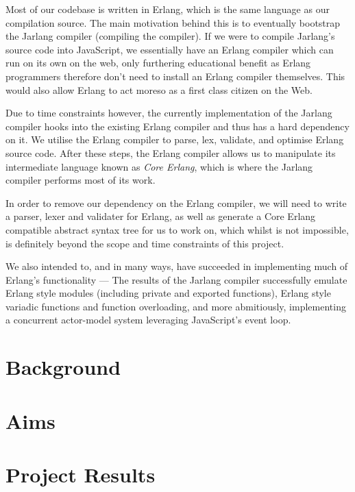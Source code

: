 \documentclass[twoside,12pt,titlepage,a4paper]{article}
\begin{document}
	Most of our codebase is written in Erlang, which is the same language as our compilation source. The main motivation behind this is to eventually bootstrap the Jarlang compiler (compiling the compiler). If we were to compile Jarlang's source code into JavaScript, we essentially have an Erlang compiler which can run on its own on the web, only furthering educational benefit as Erlang programmers therefore don't need to install an Erlang compiler themselves. This would also allow Erlang to act moreso as a first class citizen on the Web.
	
	Due to time constraints however, the currently implementation of the Jarlang compiler hooks into the existing Erlang compiler and thus has a hard dependency on it. We utilise the Erlang compiler to parse, lex, validate, and optimise Erlang source code. After these steps, the Erlang compiler allows us to manipulate its intermediate language known as \textit{Core Erlang}, which is where the Jarlang compiler performs most of its work.
	
	In order to remove our dependency on the Erlang compiler, we will need to write a parser, lexer and validater for Erlang, as well as generate a Core Erlang compatible abstract syntax tree for us to work on, which whilst is not impossible, is definitely beyond the scope and time constraints of this project.

	We also intended to, and in many ways, have succeeded in implementing much of Erlang's functionality --- The results of the Jarlang compiler successfully emulate Erlang style modules (including private and exported functions), Erlang style variadic functions and function overloading, and more abmitiously, implementing a concurrent actor-model system leveraging JavaScript's event loop.
\section{Background}
\label{Background}


\section{Aims}
\label{Aims}


\section{Project Results}
\label{Results}
\end{document}
